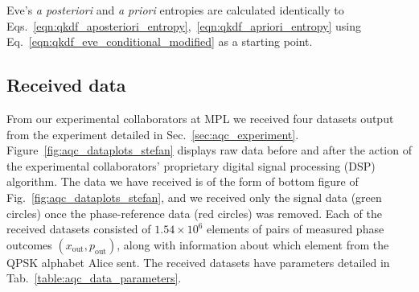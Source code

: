 Eve's \emph{a posteriori} and \emph{a priori} entropies are calculated identically to Eqs.~\ref{eqn:qkdf_aposteriori_entropy},~\ref{eqn:qkdf_apriori_entropy} using Eq.~\ref{eqn:qkdf_eve_conditional_modified} as a starting point.


\subsection{Received data}\label{sec:aqc_received_data}
From our experimental collaborators at MPL we received four datasets output from the experiment detailed in Sec.~\ref{sec:aqc_experiment}. Figure~\ref{fig:aqc_dataplots_stefan} displays raw data before and after the action of the experimental collaborators' proprietary digital signal processing (DSP) algorithm. The data we have received is of the form of bottom figure of Fig.~\ref{fig:aqc_dataplots_stefan}, and we received only the signal data (green circles) once the phase-reference data (red circles) was removed. Each of the received datasets consisted of $1.54\times10^6$ elements of pairs of measured phase outcomes $\left(x_{\text{out}}, p_{\text{out}}\right)$, along with information about which element from the QPSK alphabet Alice sent. The received datasets have parameters detailed in Tab.~\ref{table:aqc_data_parameters}.


